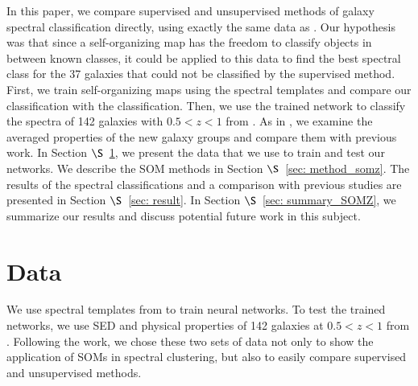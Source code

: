 In this paper, we compare supervised and unsupervised methods of galaxy spectral classification directly, using exactly the same data as .  
Our hypothesis was that since a self-organizing map has the freedom to classify objects in between known classes, it could be applied to this data 
to find the best spectral class for the 37 galaxies that could not be classified by the supervised method.
First, we train self-organizing maps using the  spectral templates and compare our classification with the  classification.
Then, we use the trained network to classify the spectra of 142 galaxies with $0.5 < z < 1$ from . 
As in , we examine the averaged properties of the new galaxy groups and compare them with previous work.
In Section $\S$~\ref{sec: data_highZ}, we present the data that we use to train and test our networks. 
We describe the SOM methods in Section $\S$~\ref{sec: method_somz}. 
The results of the spectral classifications and a comparison with previous studies are presented in Section $\S$~\ref{sec: result}. 
In Section $\S$~\ref{sec: summary_SOMZ}, we summarize our results and discuss potential future work in this subject.

\section{Data}
\label{sec: data_highZ}
We use spectral templates from  to train neural networks.
To test the trained networks, we use SED and physical properties of 142 galaxies at $0.5<z<1$ from .
Following the  work, we chose these two sets of data not only to show the application of SOMs in spectral clustering, but also to easily compare supervised and unsupervised methods.

